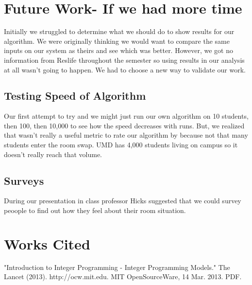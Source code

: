 \documentclass[12pt]{article}
\begin{document}
\begin{multicols}{2}

\section{Future Work- If we had more time}
Initially we struggled to determine what we should do to show results for our algorithm. We were originally thinking we would want to compare the same inputs on our system as theirs and see which was better. However, we got no information from Reslife throughout the semester so using results in our analysis at all wasn't going to happen. We had to choose a new way to validate our work.

\subsection{Testing Speed of Algorithm}
Our first attempt to try and  we might just run our own algorithm on 10 students, then 100, then 10,000 to see how the speed decreases with runs. But, we realized that wasn't really a useful metric to rate our algorithm by because not that many students enter the room swap. UMD has 4,000 students living on campus so it doesn't really reach that volume.

\subsection{Surveys}
During our presentation in class professor Hicks suggested that we could survey peoople to find out how they feel about their room situation.

\section{Works Cited}
"Introduction to Integer Programming - Integer Programming Models." The Lancet (2013). http://ocw.mit.edu. MIT OpenSourceWare, 14 Mar. 2013. PDF.

\end{multicols}
\end{document}

